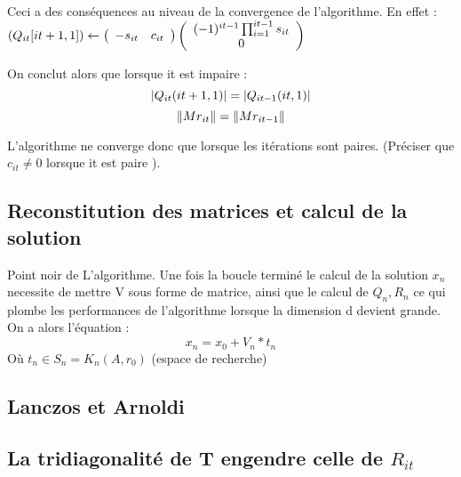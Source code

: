 \documentclass[12 pt]{article}
\begin{document}
Ceci a des conséquences au niveau de la convergence de l'algorithme. En effet :
 $ \\ 
(Q_{it}[it+1,1])
\leftarrow 
\left (\begin{array}{cc} -s_{it} & c_{it} \end{array} \right )
\left (\begin{array}{c} (-1)^{it-1}\prod_{i=1}^{it-1} s_{it} \\ 0 \end{array} \right ) \\
$

On conclut alors que lorsque it est impaire :
 \[ \\
 \vert Q_{it}(it+1,1) \vert = \vert Q_{it-1}(it,1) \vert \]
 \[ \Vert Mr_{it} \Vert = \Vert Mr_{it-1} \Vert \\ \]

L'algorithme ne converge donc que lorsque les itérations sont paires. (Préciser que $c_{it} \neq 0$ lorsque it est paire ).

\subsection*{Reconstitution des matrices et calcul de la solution}

Point noir de L'algorithme. Une fois la boucle terminé le calcul de la solution $x_n$ necessite de mettre V sous forme de matrice, ainsi que le calcul de $Q_n, R_n$ ce qui plombe les performances de l'algorithme
lorsque la dimension d devient grande. On a alors l'équation : 
\[ x_n = x_0 + V_n*t_n \] Où $t_{n} \in S_n = K_n(A,r_0)$ (espace de recherche) 

\subsection*{Lanczos et Arnoldi}

\subsection*{La tridiagonalité de T engendre celle de $R_{it}$}  
\end{document}
